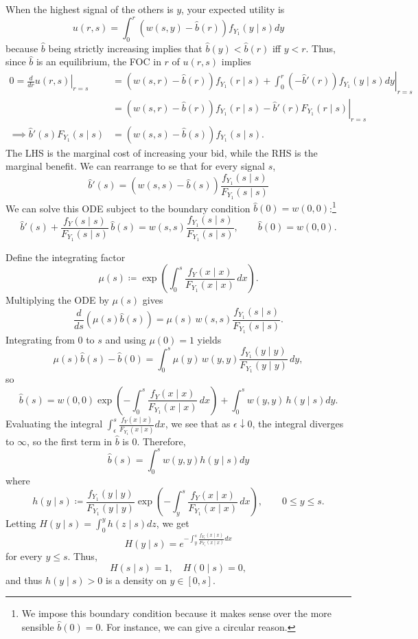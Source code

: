 When the highest signal of the others is $y$, your expected utility is \begin{equation} \label{2-12-1}
	u(r,s) = \int_{0}^{r} \left( w(s,y) - \hat{b}(r) \right)f_{Y_1}(y\mid s) dy 
\end{equation} because $\hat{b}$ being strictly increasing implies that $\hat{b}(y) < \hat{b}(r)$ iff $y < r$. 
Thus, since $\hat{b}$ is an equilibrium, the FOC in $r$ of $u(r,s)$ implies \begin{align*}
	0 = \left. \frac{d}{dr}u(r,s) \right|_{r = s} &= \left. \left( w(s,r) - \hat{b}(r) \right)f_{Y_1} (r \mid s) + \int_{0}^{r} \left( -\hat{b}'(r) \right)f_{Y_1}(y\mid s) dy \right|_{r=s}  \\
											  &= \left.\left( w(s,r) - \hat{b}(r) \right) f_{Y_1}(r \mid s) - \hat{b}'(r) F_{Y_1}(r\mid s) \right|_{r=s} \\
												  \implies \hat{b}'(s) F_{Y_1}(s\mid s) &= \left( w(s,s) - \hat{b}(s) \right)f_{Y_1}(s\mid s)
	.\end{align*} 
The LHS is the marginal cost of increasing your bid, while the RHS is the marginal benefit. We can rearrange to se that for every signal $s$,
\begin{equation} \label{2-12-2}
	\hat{b}'(s) = \left( w(s,s) - \hat{b}(s) \right) \frac{f_{Y_1} (s\mid s)}{F_{Y_1}(s\mid s)}
\end{equation}
We can solve this ODE subject to the boundary condition $\hat{b}(0) = w(0,0)$:\footnote{We impose this boundary condition because it makes sense over the more sensible $\hat{b}\left( 0 \right) = 0$. For instance, we can give a circular reason. }
\[
  \hat{b}'(s) + \frac{f_Y(s\mid s)}{F_{Y_1}(s\mid s)}\,\hat{b}(s)
  = w(s,s)\frac{f_{Y_1}(s\mid s)}{F_{Y_1}(s\mid s)},
  \qquad \hat{b}(0)=w(0,0).
\]

Define the integrating factor
\[
  \mu(s)\coloneqq\exp\left(\int_{0}^{s}\frac{f_Y(x\mid x)}{F_{Y_1}(x\mid x)}\,dx\right).
\]
Multiplying the ODE by \(\mu(s)\) gives
\[
  \frac{d}{ds}\left(\mu(s)\hat{b}(s)\right)
  = \mu(s)\,w(s,s)\frac{f_{Y_1}(s\mid s)}{F_{Y_1}(s\mid s)}.
\]
Integrating from \(0\) to \(s\) and using \(\mu(0)=1\) yields
\[
  \mu(s)\hat{b}(s) - \hat{b}(0)
  = \int_{0}^{s}\mu(y)\,w(y,y)\frac{f_{Y_1}(y\mid y)}{F_{Y_1}(y\mid y)}\,dy,
\]
so \[\hat{b}(s)
  = w(0,0)\exp\left(-\int_{0}^{s}\frac{f_Y(x\mid x)}{F_{Y_1}(x\mid x)}\,dx\right)
+ \int_{0}^{s} w(y,y)\,h(y\mid s)dy.\]
Evaluating the integral $\int_\epsilon^{s} \frac{f_Y(x\mid x)}{F_{Y_1}(x\mid x)} dx$, we see that as $\epsilon \downarrow 0$, the integral diverges to $\infty$, so the first term in $\hat{b}$ is $0$.
Therefore,
\begin{equation} \label{2-12-3}
	\hat{b}(s) = \int_{0}^{s} w(y,y) h(y\mid s)dy 
\end{equation}
where
\[
  h(y\mid s)
  \coloneqq \frac{f_{Y_1}(y\mid y)}{F_{Y_1}(y\mid y)}
     \exp\left(-\int_{y}^{s}\frac{f_Y(x\mid x)}{F_{Y_1}(x\mid x)}\,dx\right),
  \qquad 0\le y\le s.
\]
Letting $H(y \mid s) = \int_{0}^{y} h(z\mid s)dz $, we get \[
	H(y \mid s) = e^{-\int_{y}^{s} \frac{f_{Y_1}(x\mid x)}{F_{Y_1}(x\mid x)} dx }
\] for every $y \le s$. Thus, \[
H(s\mid s) = 1, \quad H(0\mid s) = 0
,\] and thus $h(y\mid s) > 0$ is a density on $y \in [0,s]$.


